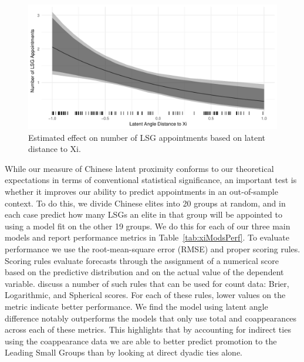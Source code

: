 \documentclass[11pt,english]{article}
\providecommand{\DIFaddbeginFL}{} %
\providecommand{\DIFaddendFL}{} %
\providecommand{\DIFdelbeginFL}{} %
\providecommand{\DIFdelendFL}{} %
\newcommand{\DIFscaledelfig}{0.5}
\newlength{\DIFdelgraphicswidth} %
\newlength{\DIFdelgraphicsheight} %
\newcommand{\DIFaddincludegraphics}[2][]{{\color{blue}\fbox{\DIFOincludegraphics[#1]{#2}}}} %
\newcommand{\DIFdelincludegraphics}[2][]{%
\sbox{\DIFdelgraphicsbox}{\DIFOincludegraphics[#1]{#2}}%
\settoboxwidth{\DIFdelgraphicswidth}{\DIFdelgraphicsbox} %
\settoboxtotalheight{\DIFdelgraphicsheight}{\DIFdelgraphicsbox} %
\scalebox{\DIFscaledelfig}{%
\parbox[b]{\DIFdelgraphicswidth}{\usebox{\DIFdelgraphicsbox}\\[-\baselineskip] \rule{\DIFdelgraphicswidth}{0em}}\llap{\resizebox{\DIFdelgraphicswidth}{\DIFdelgraphicsheight}{%
\setlength{\unitlength}{\DIFdelgraphicswidth}%
\begin{picture}(1,1)%
\thicklines\linethickness{2pt} %
{\color[rgb]{1,0,0}\put(0,0){\framebox(1,1){}}}%
{\color[rgb]{1,0,0}\put(0,0){\line( 1,1){1}}}%
{\color[rgb]{1,0,0}\put(0,1){\line(1,-1){1}}}%
\end{picture}%
}\hspace*{3pt}}} %
} %
\DeclareRobustCommand{\DIFaddbeginFL}{\DIFOaddbeginFL \let\includegraphics\DIFaddincludegraphics} %
\DeclareRobustCommand{\DIFaddendFL}{\DIFOaddendFL \let\includegraphics\DIFOincludegraphics} %
\DeclareRobustCommand{\DIFdelbeginFL}{\DIFOdelbeginFL \let\includegraphics\DIFdelincludegraphics} %
\DeclareRobustCommand{\DIFdelendFL}{\DIFOaddendFL \let\includegraphics\DIFOincludegraphics} %
\begin{document}
\begin{flushleft}
\noindent \begin{center}
\begin{figure}[H]
\noindent \begin{centering}
\DIFdelbeginFL %
\DIFdelendFL \DIFaddbeginFL \includegraphics[width=1\textwidth]{effects}
\DIFaddendFL \par\end{centering}
\caption{Estimated effect on number of LSG appointments based on latent distance to Xi.}
\label{fig:effects}
\end{figure}
\par\end{center}

While our measure of Chinese latent proximity conforms to our theoretical expectations in terms of conventional statistical significance, an important test is whether it improves our ability to predict appointments in an out-of-sample context. To do this, we divide Chinese elites into 20 groups at random, and in each case predict how many LSGs an elite in that group will be appointed to using a model fit on the other 19 groups. We do this for each of our three main models and report performance metrics in Table~\ref{tab:xiModsPerf}. To evaluate performance we use the root-mean-square error (RMSE) and proper scoring rules. Scoring rules evaluate forecasts through the assignment of a numerical score based on the predictive distribution and on the actual value of the dependent variable. \citet{czado:etal:2009} discuss a number of such rules that can be used for count data: Brier, Logarithmic, and Spherical scores. For each of these rules, lower values on the metric indicate better performance. We find the model using latent angle difference notably outperforms the models that only use total and coappearances across each of these metrics. This highlights that by accounting for indirect ties using the coappearance data we are able to better predict promotion to the Leading Small Groups than by looking at direct dyadic ties alone.


\end{flushleft}
\end{document}
